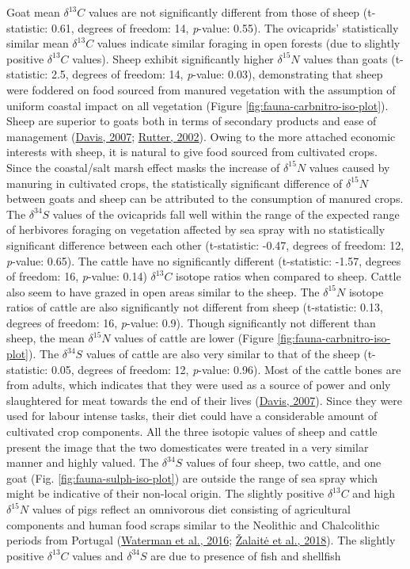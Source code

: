 \documentclass[preprint, 3p, authoryear]{elsarticle} %
\begin{document}
Goat mean \(\delta ^{13}C\) values are not significantly different from those of sheep (t-statistic: 0.61, degrees of freedom: 14, \emph{p}-value: 0.55). The ovicaprids' statistically similar mean \(\delta ^{13}C\) values indicate similar foraging in open forests (due to slightly positive \(\delta ^{13}C\) values). Sheep exhibit significantly higher \(\delta ^{15}N\) values than goats (t-statistic: 2.5, degrees of freedom: 14, \emph{p}-value: 0.03), demonstrating that sheep were foddered on food sourced from manured vegetation with the assumption of uniform coastal impact on all vegetation (Figure \ref{fig:fauna-carbnitro-iso-plot}). Sheep are superior to goats both in terms of secondary products and ease of management (\protect\hyperlink{ref-davis07}{Davis, 2007}; \protect\hyperlink{ref-rutter02}{Rutter, 2002}). Owing to the more attached economic interests with sheep, it is natural to give food sourced from cultivated crops. Since the coastal/salt marsh effect masks the increase of \(\delta ^{15}N\) values caused by manuring in cultivated crops, the statistically significant difference of \(\delta ^{15}N\) between goats and sheep can be attributed to the consumption of manured crops. The \(\delta ^{34}S\) values of the ovicaprids fall well within the range of the expected range of herbivores foraging on vegetation affected by sea spray with no statistically significant difference between each other (t-statistic: -0.47, degrees of freedom: 12, \emph{p}-value: 0.65). The cattle have no significantly different (t-statistic: -1.57, degrees of freedom: 16, \emph{p}-value: 0.14) \(\delta ^{13}C\) isotope ratios when compared to sheep. Cattle also seem to have grazed in open areas similar to the sheep. The \(\delta ^{15}N\) isotope ratios of cattle are also significantly not different from sheep (t-statistic: 0.13, degrees of freedom: 16, \emph{p}-value: 0.9). Though significantly not different than sheep, the mean \(\delta ^{15}N\) values of cattle are lower (Figure \ref{fig:fauna-carbnitro-iso-plot}). The \(\delta ^{34}S\) values of cattle are also very similar to that of the sheep (t-statistic: 0.05, degrees of freedom: 12, \emph{p}-value: 0.96). Most of the cattle bones are from adults, which indicates that they were used as a source of power and only slaughtered for meat towards the end of their lives (\protect\hyperlink{ref-davis07}{Davis, 2007}). Since they were used for labour intense tasks, their diet could have a considerable amount of cultivated crop components. All the three isotopic values of sheep and cattle present the image that the two domesticates were treated in a very similar manner and highly valued. The \(\delta ^{34}S\) values of four sheep, two cattle, and one goat (Fig. \ref{fig:fauna-sulph-iso-plot}) are outside the range of sea spray which might be indicative of their non-local origin. The slightly positive \(\delta ^{13}C\) and high \(\delta ^{15}N\) values of pigs reflect an omnivorous diet consisting of agricultural components and human food scraps similar to the Neolithic and Chalcolithic periods from Portugal (\protect\hyperlink{ref-waterman_etal16}{Waterman et al., 2016}; \protect\hyperlink{ref-zalaite_etal18}{Žalaitė et al., 2018}). The slightly positive \(\delta ^{13}C\) values and \(\delta ^{34}S\) are due to presence of fish and shellfish 
\end{document}
